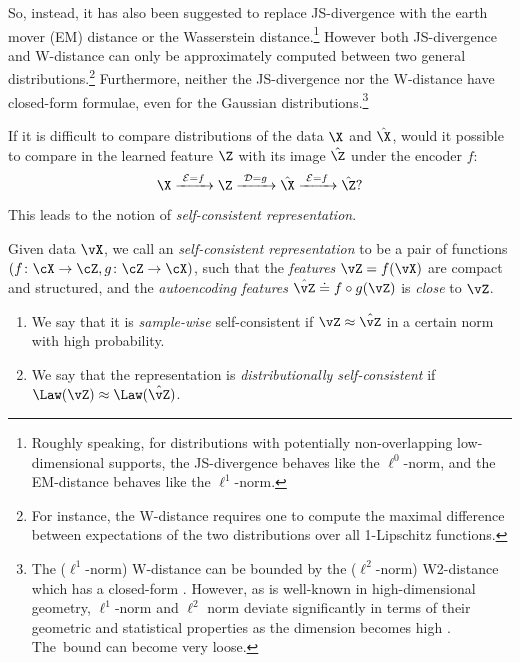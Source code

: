 \documentclass[../../book-main.tex]{subfiles}
\begin{document}
So, instead, it has also been suggested to replace JS-divergence with the earth mover (EM) distance or the Wasserstein distance.\footnote{Roughly speaking, for distributions with potentially non-overlapping low-dimensional supports, the JS-divergence behaves like the $\ell^0$-norm, and the EM-distance behaves like the $\ell^1$-norm.} However both JS-divergence and W-distance can only be approximately computed between two general distributions.\footnote{For instance, the W-distance requires one to compute the maximal difference between expectations of the two distributions over all 1-Lipschitz functions.} Furthermore, neither the JS-divergence nor the W-distance have closed-form formulae, even for the Gaussian distributions.\footnote{The ($\ell^1$-norm) W-distance can be bounded by the ($\ell^2$-norm) W2-distance which has a closed-form \cite{salmona2021gromovwasserstein}. However, as is well-known in high-dimensional geometry, $\ell^1$-norm and $\ell^2$ norm deviate significantly in terms of their geometric and statistical properties as the dimension becomes high \cite{Wright-Ma-2021}. The~bound can become very loose.} 

If it is difficult to compare distributions of the data $\X$ and $\hat \X$, would it possible to compare in the learned feature $\Z$ with its image $\hat \Z$ under the encoder $f$: 
\begin{equation}
 \X
\xrightarrow{\hspace{1mm} \mathcal{E} = f \hspace{1mm}} \Z  \xrightarrow{\hspace{1mm} \mathcal{D} = g \hspace{1mm}} \hat{\X} \xrightarrow{\hspace{1mm} \mathcal{E} = f \hspace{1mm}} \hat \Z?
\label{eqn:closed-autoencoding}
\end{equation}
This leads to the notion of {\em self-consistent representation}.
\begin{definition}\label{def:closed_loop}
    Given data \(\vX\), we call an \textit{self-consistent representation} to be a pair of functions \((f \colon \cX \to \cZ, g \colon \cZ \to \cX)\), such that the \textit{features} \(\vZ = f(\vX)\) are compact and structured, and the \textit{autoencoding features} \(\hat{\vZ} \doteq f \circ g(\vZ)\) is \textit{close} to \(\vZ\). 
    \begin{enumerate}
        \item We say that it is \textit{sample-wise} self-consistent if \(\vZ \approx \hat{\vZ}\) in a certain norm  with high probability.
        \item We say that the representation is \textit{distributionally self-consistent} if \(\Law(\vZ) \approx \Law(\hat{\vZ})\).
    \end{enumerate}
\end{definition}
\end{document}
